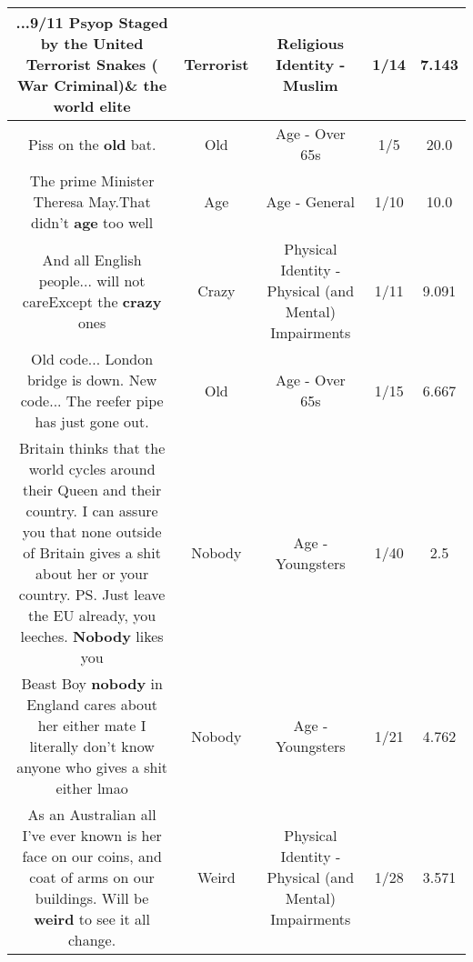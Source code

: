 \documentclass[11pt]{article}
\newlength\mylength
\begin{document}
\begin{center}
\begin{longtable}{|C{.65\mylength}|C{.30\mylength}|C{.12\mylength}|C{.12\mylength}|C{.12\mylength}|}
  \small ...9/11 Psyop Staged by the United \textbf{Terrorist} Snakes ( War Criminal)\& the world elite\normalsize   & Terrorist & Religious Identity - Muslim & 1/14 & 7.143 \\  \hline
  \small Piss on the \textbf{old} bat.\normalsize   & Old & Age - Over 65s & 1/5 & 20.0 \\  \hline
  \small The prime Minister Theresa May.That didn't \textbf{age} too well\normalsize   & Age & Age - General & 1/10 & 10.0 \\  \hline
  \small And all English people... will not careExcept the \textbf{crazy} ones\normalsize   & Crazy & Physical Identity - Physical (and Mental) Impairments & 1/11 & 9.091 \\  \hline
  \small Old code... London bridge is down. New code... The reefer pipe has just gone out.\normalsize   & Old & Age - Over 65s & 1/15 & 6.667 \\  \hline
  \small Britain thinks that the world cycles around their Queen and their country. I can assure you that none outside of Britain gives a shit about her or your country. PS. Just leave the EU already, you leeches. \textbf{Nobody} likes you\normalsize   & Nobody & Age - Youngsters & 1/40 & 2.5 \\  \hline
  \small Beast Boy \textbf{nobody} in England cares about her either mate I literally don't know anyone who gives a shit either lmao\normalsize   & Nobody & Age - Youngsters & 1/21 & 4.762 \\  \hline
  \small As an Australian all I've ever known is her face on our coins, and coat of arms on our buildings. Will be \textbf{weird} to see it all change.\normalsize   & Weird & Physical Identity - Physical (and Mental) Impairments & 1/28 & 3.571 \\  \hline

\end{longtable}
\end{center}
\end{document}
